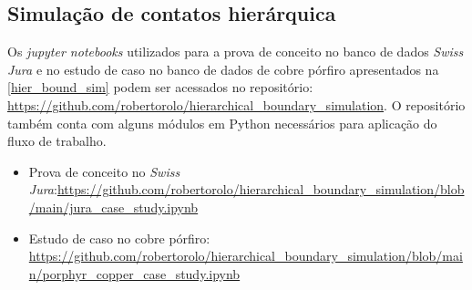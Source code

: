 \subsection{Simulação de contatos hierárquica}

Os \textit{jupyter notebooks} utilizados para a prova de conceito no banco de dados \textit{Swiss Jura} e no estudo de caso no banco de dados de cobre pórfiro apresentados na \autoref{hier_bound_sim} podem ser acessados no repositório: \url{https://github.com/robertorolo/hierarchical_boundary_simulation}. O repositório também conta com alguns módulos em Python necessários para aplicação do fluxo de trabalho.

\begin{itemize}
    \item Prova de conceito no \textit{Swiss Jura}:\url{https://github.com/robertorolo/hierarchical_boundary_simulation/blob/main/jura_case_study.ipynb}
    \item Estudo de caso no cobre pórfiro: \url{https://github.com/robertorolo/hierarchical_boundary_simulation/blob/main/porphyr_copper_case_study.ipynb}
\end{itemize}

















